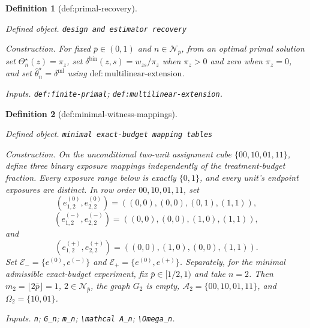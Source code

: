 \documentclass{article}
\newtheorem{definition}{Definition}
\begin{document}
\begin{definition}[def:primal-recovery]\label{def:primal-recovery}
\par\smallskip\noindent\emph{Defined object.} \texttt{design and estimator recovery}
\par\smallskip\noindent\emph{Construction.} For fixed \(\bar p\in(0,1)\) and \(n\in\mathcal N_{\bar p}\), from an optimal primal solution set \(\Theta_n^\star(z)=\pi_z\), set \(\delta^{\mathrm{bin}}(z,s)=w_{zs}/\pi_z\) when \(\pi_z>0\) and zero when \(\pi_z=0\), and set \(\widehat\theta_n^\star=\delta^{\mathrm{ml}}\) using \(\mathrm{def{:}multilinear\text{-}extension}\).
\par\smallskip\noindent\emph{Inputs.} \texttt{def:\allowbreak{}finite-\allowbreak{}primal}; \texttt{def:\allowbreak{}multilinear-\allowbreak{}extension}.
\end{definition}

\begin{definition}[def:minimal-witness-mappings]\label{def:minimal-witness-mappings}
\par\smallskip\noindent\emph{Defined object.} \texttt{minimal exact-\allowbreak{}budget mapping tables}
\par\smallskip\noindent\emph{Construction.} On the unconditional two-unit assignment cube \(\{00,10,01,11\}\), define three binary exposure mappings independently of the treatment-budget fraction.  Every exposure range below is exactly \(\{0,1\}\), and every unit's endpoint exposures are distinct.  In row order \(00,10,01,11\), set
\[
 (e^{(0)}_{1,2},e^{(0)}_{2,2})=((0,0),(0,0),(0,1),(1,1)),
\]
\[
 (e^{(-)}_{1,2},e^{(-)}_{2,2})=((0,0),(0,0),(1,0),(1,1)),
\]
and
\[
 (e^{(+)}_{1,2},e^{(+)}_{2,2})=((0,0),(1,0),(0,0),(1,1)).
\]
Set \(\mathcal E_-=\{e^{(0)},e^{(-)}\}\) and \(\mathcal E_+=\{e^{(0)},e^{(+)}\}\).  Separately, for the minimal admissible exact-budget experiment, fix \(\bar p\in[1/2,1)\) and take \(n=2\).  Then \(m_2=\lfloor2\bar p\rfloor=1\), \(2\in\mathcal N_{\bar p}\), the graph \(G_2\) is empty, \(\mathcal A_2=\{00,10,01,11\}\), and \(\Omega_2=\{10,01\}\).
\par\smallskip\noindent\emph{Inputs.} \texttt{n}; \texttt{G\_\allowbreak{}n}; \texttt{m\_\allowbreak{}n}; \texttt{\textbackslash{}\allowbreak{}mathcal A\_\allowbreak{}n}; \texttt{\textbackslash{}\allowbreak{}Omega\_\allowbreak{}n}.
\end{definition}
\end{document}
